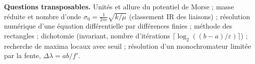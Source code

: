 \documentclass[11pt,a4paper]{article}
\begin{document}
\textbf{Questions transposables.} Unités et allure du potentiel de Morse ; masse réduite et nombre d'onde \(\sigma_0 = \frac{1}{2\pi c}\sqrt{k/\mu}\) (classement IR des liaisons) ; résolution numérique d'une équation différentielle par différences finies ; méthode des rectangles ; dichotomie (invariant, nombre d'itérations \(\lceil \log_2((b-a)/\varepsilon)\rceil\)) ; recherche de maxima locaux avec seuil ; résolution d'un monochromateur limitée par la fente, \(\Delta\lambda = ab/f'\).
\end{document}
